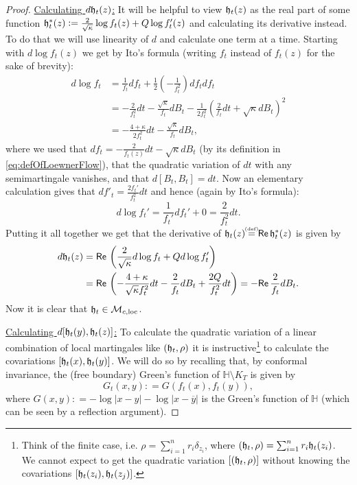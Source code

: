 \documentclass[11pt,reqno]{amsart}
\numberwithin{equation}{section}
\newcommand{\eqbydef}{\mathrel{\stackrel{\hspace*{-3mm}\text{\tiny(def)}\hspace*{-3mm}}{=}}}
\newcommand{\deq}{\mathrel{\mathop:}=}
\renewcommand{\Re}{\mathsf{Re}\,}
\newcommand{\fh}{{\frak h}}
\begin{document}
\begin{proof}
	\underline{Calculating $d\fh_t(z)$:} It will be helpful to view $\fh_t(z)$ as the real part of some function $\fh_t^*(z)\deq \frac{2}{\sqrt\kappa}\log f_t(z)+Q\log f_t'(z)$ and calculating its derivative instead. To do that we will use linearity of $d$ and calculate one term at a time. Starting with $d\log f_t(z)$ we get by Ito's formula (writing $f_t$ instead of $f_t(z)$ for the sake of brevity):
	\begin{align*}
		d\log f_t &=\frac{1}{f_t}df_t+\frac{1}{2}\left(-\frac{1}{f_t^2}\right)df_tdf_t\\
		&=-\frac{2}{f_t^2}dt-\frac{\sqrt\kappa}{f_t}dB_t-\frac{1}{2f_t^2}\left(\frac{2}{f_t}dt+\sqrt\kappa dB_t\right)^2\\
		&=-\frac{4+\kappa}{2f_t^2}dt-\frac{\sqrt\kappa}{f_t}dB_t,
	\end{align*}
	where we used that $df_t=-\frac{2}{f_t(z)}dt-\sqrt\kappa dB_t$ (by its definition in \eqref{eq:defOfLoewnerFlow}), that the quadratic variation of $dt$ with any semimartingale vanishes, and that $d[B_t,B_t]=dt$.
	Now an elementary calculation gives that $df'_t=\frac{2f_t'}{f_t^2}dt$ and hence (again by Ito's formula):
	$$d\log f_t'=\frac{1}{f_t'}df_t'+0=\frac{2}{f_t^2}dt.$$
	Putting it all together we get that the derivative of $\fh_t(z)\eqbydef\Re\fh_t^*(z)$ is given by 
	\begin{align*}
		d\fh_t(z)&=\Re\left(\frac{2}{\sqrt\kappa}d\log f_t+Qd\log f_t' \right)\\
		&=\Re\left(-\frac{4+\kappa}{\sqrt\kappa f_t^2}dt-\frac{2}{f_t}dB_t+\frac{2Q}{f_t^2}dt\right)=-\Re\frac{2}{f_t}dB_t.
	\end{align*}
	Now it is clear that $\fh_t\in\mathcal M_{c,\text{loc}}$.
	
	\underline{Calculating $d[\fh_t(y),\fh_t(z)]$:} To calculate the quadratic variation of a linear combination of local martingales like $(\fh_t,\rho)$ it is instructive\footnote{Think of the finite case, i.e. $\rho = \sum_{i=1}^n r_i\delta_{z_i}$, where $(\fh_t,\rho) = \sum_{i=1}^n r_i\fh_t(z_i)$. We cannot expect to get the quadratic variation $[(\fh_t,\rho)]$ without knowing the covariations $[\fh_t(z_i),\fh_t(z_j)]$.} to calculate the covariations $[\fh_t(x),\fh_t(y)]$. We will do so by recalling that, by conformal invariance, the (free boundary) Green's function of $\mathbb H\setminus K_T$ is given by $$G_t(x,y)\deq G(f_t(x),f_t(y)),$$
	where $G(x,y)\deq -\log|x-y|-\log|x-\overline y|$ is the Green's function of $\mathbb H$ (which can be seen by a reflection argument).
	

\end{proof}
\end{document}
